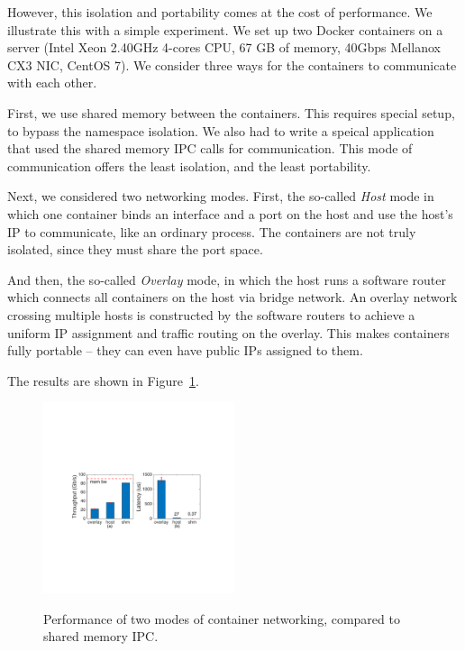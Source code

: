However, this isolation and portability comes at the cost of performance. We
illustrate this with a simple experiment.  We set up two Docker containers on a
server (Intel Xeon 2.40GHz 4-cores CPU, 67 GB of memory, 40Gbps Mellanox CX3
NIC, CentOS 7). We consider three ways for the containers to communicate with
each other. 

First, we use shared memory between the containers. This requires special setup,
to bypass the namespace isolation. We also had to write a speical application
that used the shared memory IPC calls for communication. This mode of
communication offers the least isolation, and the least portability. 

Next, we considered two networking modes. First, the so-called {\em Host} mode
in which one container binds an interface and a port on the host and use the
host's IP to communicate, like an ordinary process.  The containers are not
truly isolated, since they must share the port space.

And then, the so-called {\em Overlay} mode, in which the host runs a software
router which connects all containers on the host via bridge network. An overlay
network crossing multiple hosts is constructed by the software routers to
achieve a uniform IP assignment and traffic routing on the overlay. This makes
containers fully portable -- they can even have public IPs assigned to them. 

The results are shown in Figure~\ref{fig:three_modes}.

\begin{figure}[ht]
     \centering 
     \includegraphics[width=0.5\textwidth]{figures/intro/intro_exist2.pdf} 
     \label{fig:three_modes}
     \caption{Performance of two modes of container networking, compared to
     shared memory IPC.} 
\end{figure} 

